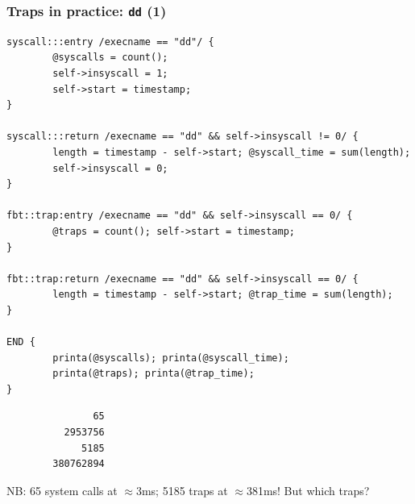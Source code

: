 \begin{frame}[fragile]
  \frametitle{Traps in practice: \texttt{dd} (1)}

  \begin{tiny}
\begin{verbatim}
syscall:::entry /execname == "dd"/ {
        @syscalls = count();
        self->insyscall = 1;
        self->start = timestamp;
}

syscall:::return /execname == "dd" && self->insyscall != 0/ {
        length = timestamp - self->start; @syscall_time = sum(length);
        self->insyscall = 0;
}

fbt::trap:entry /execname == "dd" && self->insyscall == 0/ {
        @traps = count(); self->start = timestamp;
}

fbt::trap:return /execname == "dd" && self->insyscall == 0/ {
        length = timestamp - self->start; @trap_time = sum(length);
}

END {
        printa(@syscalls); printa(@syscall_time);
        printa(@traps); printa(@trap_time);
}
\end{verbatim}
  \end{tiny}

  \pause

  \begin{tiny}
\begin{verbatim}
               65
          2953756
             5185
        380762894
\end{verbatim}
  \end{tiny}

  \pause

  NB: 65 system calls at $\approx$3ms; 5185 traps at $\approx$381ms!  But
    which traps?
\end{frame}

